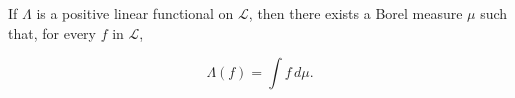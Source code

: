 If $\Lambda$ is a positive linear functional on $\mathcal{L}$, then there exists a Borel measure $\mu$ such that, for every $f$ in $\mathcal{L}$,

$$\Lambda(f) = \int f \, d\mu.$$
